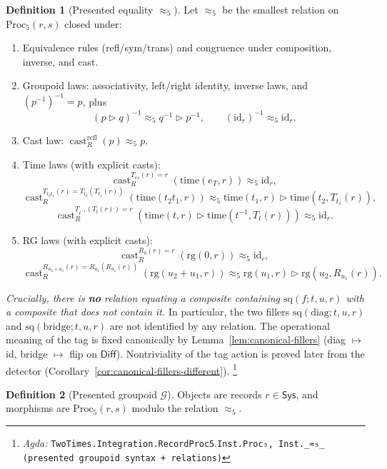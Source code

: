 \documentclass{article}
\newcommand{\Sys}{\mathsf{Sys}}
\newcommand{\Diff}{\mathsf{Diff}}
\newcommand{\castR}[2]{\operatorname{cast}_R^{#1}\!\left(#2\right)}
\newcommand{\Agda}[1]{\texttt{#1}}
\newcommand{\AgdaRef}[2]{\emph{Agda: }\Agda{#1}.\Agda{#2}}
\newcommand{\AgdaNote}[2]{\footnote{\AgdaRef{#1}{#2}}}
\theoremstyle{definition}
\newtheorem{definition}{Definition}[section]
\theoremstyle{plain}
\begin{document}
\begin{definition}[Presented equality $\approx_5$]
\label{def:limited-scope-theorem-translation-001}
Let $\approx_5$ be the smallest relation on $\mathrm{Proc}_5(r,s)$ closed under:
\begin{enumerate}[label=\textbf{(R\arabic*)},leftmargin=*,itemsep=0.4em]
\item Equivalence rules (refl/sym/trans) and congruence under
composition, inverse, and cast.
\item Groupoid laws: associativity, left/right identity, inverse laws, and
$(p^{-1})^{-1}=p$, plus
\[
(p\triangleright q)^{-1}\approx_5 q^{-1}\triangleright p^{-1},\qquad
(\mathrm{id}_r)^{-1}\approx_5 \mathrm{id}_r.
\]
\item Cast law: $\castR{\mathrm{refl}}{p}\approx_5 p$.
\item Time laws (with explicit casts):
\[
\castR{T_{e_T}(r)=r}{\mathrm{time}(e_T,r)}\approx_5 \mathrm{id}_r,
\]
\[
\castR{T_{t_2t_1}(r)=T_{t_2}(T_{t_1}(r))}{\mathrm{time}(t_2t_1,r)}
\approx_5 \mathrm{time}(t_1,r)\triangleright \mathrm{time}(t_2,T_{t_1}(r)),
\]
\[
\castR{T_{t^{-1}}(T_t(r))=r}{
  \mathrm{time}(t,r)\triangleright \mathrm{time}(t^{-1},T_t(r))
}\approx_5 \mathrm{id}_r.
\]
\item RG laws (with explicit casts):
\[
\castR{R_0(r)=r}{\mathrm{rg}(0,r)}\approx_5 \mathrm{id}_r,
\]
\[
\castR{R_{u_2+u_1}(r)=R_{u_2}(R_{u_1}(r))}{\mathrm{rg}(u_2+u_1,r)}
\approx_5 \mathrm{rg}(u_1,r)\triangleright \mathrm{rg}(u_2,R_{u_1}(r)).
\]
\end{enumerate}
\emph{Crucially, there is \textbf{no} relation equating a composite containing
$\mathrm{sq}(f;t,u,r)$ with a composite that does not contain it.}
In particular, the two fillers $\mathrm{sq}(\mathrm{diag};t,u,r)$ and
$\mathrm{sq}(\mathrm{bridge};t,u,r)$ are not identified by any relation.
The operational meaning of the tag is fixed canonically by
Lemma~\ref{lem:canonical-fillers} (diag $\mapsto$ id, bridge $\mapsto$ flip on $\Diff$).
Nontriviality of the tag action is proved later from the detector
(Corollary~\ref{cor:canonical-fillers-different}).
\AgdaNote{TwoTimes.Integration.RecordProc5}{Inst.Proc₅, Inst._≈₅_ (presented groupoid syntax + relations)}
\end{definition}

\begin{definition}[Presented groupoid $\mathcal G$]
\label{def:limited-scope-theorem-translation-002}
Objects are records $r\in\Sys$, and morphisms are $\mathrm{Proc}_5(r,s)$ modulo
the relation $\approx_5$.
\end{definition}
\end{document}
